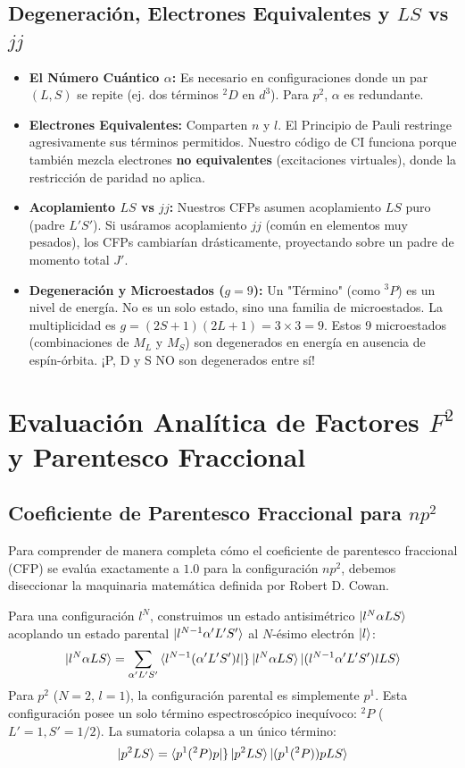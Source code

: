 \documentclass[11pt,a4paper]{article}
\begin{document}
\subsection{Degeneración, Electrones Equivalentes y $LS$ vs $jj$}
\begin{itemize}
    \item \textbf{El Número Cuántico $\alpha$:} Es necesario en configuraciones donde un par $(L, S)$ se repite (ej. dos términos $^2D$ en $d^3$). Para $p^2$, $\alpha$ es redundante.
    \item \textbf{Electrones Equivalentes:} Comparten $n$ y $l$. El Principio de Pauli restringe agresivamente sus términos permitidos. Nuestro código de CI funciona porque también mezcla electrones \textbf{no equivalentes} (excitaciones virtuales), donde la restricción de paridad no aplica.
    \item \textbf{Acoplamiento $LS$ vs $jj$:} Nuestros CFPs asumen acoplamiento $LS$ puro (padre $L'S'$). Si usáramos acoplamiento $jj$ (común en elementos muy pesados), los CFPs cambiarían drásticamente, proyectando sobre un padre de momento total $J'$.
    \item \textbf{Degeneración y Microestados ($g=9$):} Un "Término" (como $^3P$) es un nivel de energía. No es un solo estado, sino una familia de microestados. La multiplicidad es $g = (2S+1)(2L+1) = 3 \times 3 = 9$. Estos 9 microestados (combinaciones de $M_L$ y $M_S$) son degenerados en energía en ausencia de espín-órbita. ¡P, D y S NO son degenerados entre sí!
\end{itemize}


\newpage
\section{Evaluación Analítica de Factores $F^2$ y Parentesco Fraccional}

\subsection{Coeficiente de Parentesco Fraccional para $np^2$}
Para comprender de manera completa cómo el coeficiente de parentesco fraccional (CFP) se evalúa exactamente a $1.0$ para la configuración $np^2$, debemos diseccionar la maquinaria matemática definida por Robert D. Cowan. 

Para una configuración $l^N$, construimos un estado antisimétrico $\ket{l^N \alpha L S}$ acoplando un estado parental $\ket{l^{N-1} \alpha' L' S'}$ al $N$-ésimo electrón $\ket{l}$:
\begin{equation}
\ket{l^N \alpha L S} = \sum_{\alpha' L' S'} \bra{l^{N-1}(\alpha' L' S')l} \}\ket{l^N \alpha L S} \ket{(l^{N-1} \alpha' L' S') l L S}
\end{equation}
Para $p^2$ ($N = 2$, $l = 1$), la configuración parental es simplemente $p^1$. Esta configuración posee un solo término espectroscópico inequívoco: $^2P$ ($L'=1, S'=1/2$).
La sumatoria colapsa a un único término:
\begin{equation}
\ket{p^2 L S} = \bra{p^1(^2P) p} \}\ket{p^2 L S} \ket{(p^1(^2P)) p L S}
\end{equation}
\end{document}
